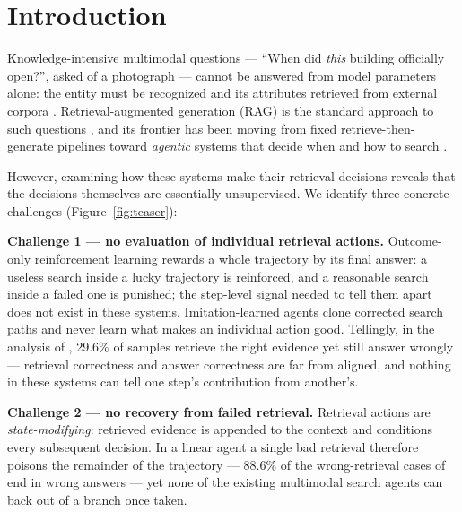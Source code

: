 \documentclass[letterpaper,twocolumn,10pt]{article}
\begin{document}
\section{Introduction}
\label{sec:intro}

Knowledge-intensive multimodal questions --- ``When did \emph{this}
building officially open?'', asked of a photograph --- cannot be answered
from model parameters alone: the entity must be recognized and its
attributes retrieved from external corpora
\cite{chen2023infoseek,hu2023oven}. Retrieval-augmented generation (RAG)
is the standard approach to such questions
\cite{caffagni2024wikillava,yan2024echosight,lin2024preflmr}, and its
frontier has been moving from fixed retrieve-then-generate pipelines
toward \emph{agentic} systems that decide when and how to search
\cite{wu2025mmsearchr1,chen2026learningtosearch}.

However, examining how these systems make their retrieval decisions
reveals that the decisions themselves are essentially unsupervised. We
identify three concrete challenges (Figure~\ref{fig:teaser}):

\noindent\textbf{Challenge 1 --- no evaluation of individual retrieval
actions.} Outcome-only reinforcement learning
\cite{wu2025mmsearchr1,wang2025vragrl} rewards a whole trajectory by its
final answer: a useless search inside a lucky trajectory is reinforced,
and a reasonable search inside a failed one is punished; the step-level
signal needed to tell them apart does not exist in these systems.
Imitation-learned agents \cite{chen2026learningtosearch} clone corrected
search paths and never learn what makes an individual action good.
Tellingly, in the analysis of \citet{chen2026learningtosearch}, 29.6\% of
samples retrieve the right evidence yet still answer wrongly --- retrieval
correctness and answer correctness are far from aligned, and nothing in
these systems can tell one step's contribution from another's.

\noindent\textbf{Challenge 2 --- no recovery from failed retrieval.}
Retrieval actions are \emph{state-modifying}: retrieved evidence is
appended to the context and conditions every subsequent decision. In a
linear agent a single bad retrieval therefore poisons the remainder of the
trajectory --- 88.6\% of the wrong-retrieval cases of
\citet{chen2026learningtosearch} end in wrong answers --- yet none of the
existing multimodal search agents can back out of a branch once taken.
\end{document}
